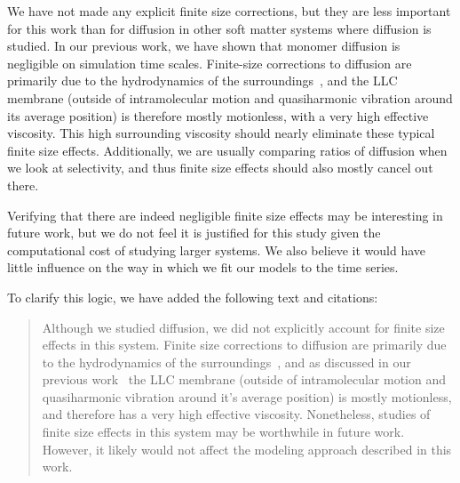 \documentclass{article}
\begin{document}
\begin{enumerate}[label={Comment \theenumi :}, leftmargin=3.9\parindent]
        We have not made any explicit finite size corrections, but they are less 
        important for this work than for diffusion in other soft matter systems 
        where diffusion is studied. In our previous work, we have shown that 
        monomer diffusion is negligible on simulation time scales. Finite-size 
        corrections to diffusion are primarily due to the hydrodynamics of the 
        surroundings~\cite{venable_lipid_2017,yeh_system-size_2004}, and the LLC
        membrane (outside of intramolecular motion and quasiharmonic vibration 
        around its average position) is therefore mostly motionless, with a very
        high effective viscosity. This high surrounding viscosity should nearly 
        eliminate these typical finite size effects. Additionally, we are usually 
        comparing ratios of diffusion when we look at selectivity, and thus finite 
        size effects should also mostly cancel out there.

        Verifying that there are indeed negligible finite size effects may be 
        interesting in future work, but we do not feel it is justified for this 
        study given the computational cost of studying larger systems. We also 
        believe it would have little influence on the way in which we fit our models
        to the time series.
        

  To clarify this logic, we have added the following text and citations:
  \begin{quote}
    Although we studied diffusion, we did not explicitly account for finite size effects
    in this system. Finite size corrections to diffusion are primarily due to the
    hydrodynamics of the surroundings~\cite{venable_lipid_2017,yeh_system-size_2004}, and
    as discussed in our previous work~\cite{coscia_understanding_2019} the LLC membrane
    (outside of intramolecular motion and quasiharmonic vibration around it's average 
    position) is mostly motionless, and therefore has a very high effective viscosity.
    Nonetheless, studies of finite size effects in this system may be worthwhile in
    future work. However, it likely would not affect the modeling approach described in
    this work.
  \end{quote}
  

\end{enumerate}
\end{document}
